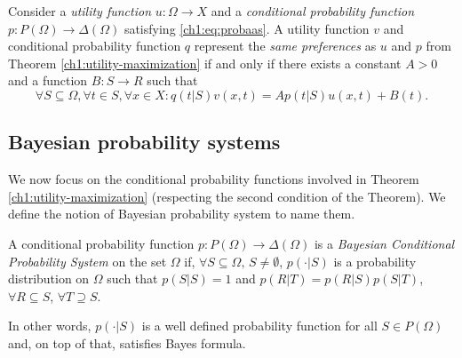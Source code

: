 \begin{theorem}
Consider a \emph{utility function} $u : \Omega \rightarrow X$ and a \emph{conditional probability function} $p : P(\Omega) \rightarrow \Delta(\Omega)$ satisfying \ref{ch1:eq:probaas}.
A utility function $v$ and conditional probability function $q$ represent the \emph{same preferences} as $u$ and $p$ from Theorem \ref{ch1:utility-maximization} if and only if there  exists a constant $A > 0$ and a function $B : S \rightarrow R$ such that
$$ \forall S \subseteq \Omega, \forall t \in S, \forall x \in X: q(t|S) v(x,t) = Ap(t|S)u(x,t) + B(t). $$
\label{chap1:thm:Equivalent}
\end{theorem}


\subsection{Bayesian probability systems}

We now focus on the conditional probability functions involved in Theorem \ref{ch1:utility-maximization} (respecting the second condition of the Theorem). We define the notion of Bayesian probability system to name them.


\begin{definition}
A conditional probability function $p: P(\Omega) \rightarrow \Delta(\Omega)$ is a \emph{Bayesian Conditional Probability System} on the set $\Omega$ if, $\forall S \subseteq \Omega, \, S \neq \emptyset$, $p(\cdot|S)$ is a probability distribution on $\Omega$ such that $p(S|S) = 1$ and $p(R|T) = p(R|S) p(S|T)$, $\forall R \subseteq S$, $\forall T \supseteq S.$
\end{definition}

In other words, $p(\cdot|S)$  is a well defined probability function for all $S \in P(\Omega)$ and, on top of that, satisfies Bayes formula.



